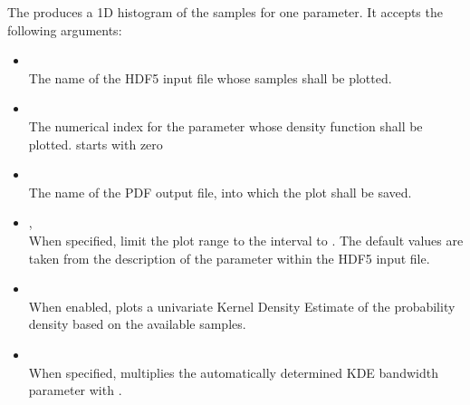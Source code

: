 The  produces a 1D histogram of the samples for one parameter.
It accepts the following arguments:
\begin{itemize}
    \item[] \\[\medskipamount]
        The name of the HDF5 input file whose samples shall be plotted.

    \item[] \\[\medskipamount]
        The numerical index for the parameter whose density function shall
        be plotted.  starts with zero

    \item[] \\[\medskipamount]
        The name of the PDF output file, into which the plot shall be saved.

    \item[] , \\[\medskipamount]
        When specified, limit the plot range to the interval  to .
        The default values are taken from the description of the parameter within the
        HDF5 input file.

    \item[] \\[\medskipamount]
        When enabled, plots a univariate Kernel Density Estimate of the probability
        density based on the available samples.

    \item[] \\[\medskipamount]
        When specified, multiplies the automatically determined KDE bandwidth parameter
        with .
\end{itemize}

